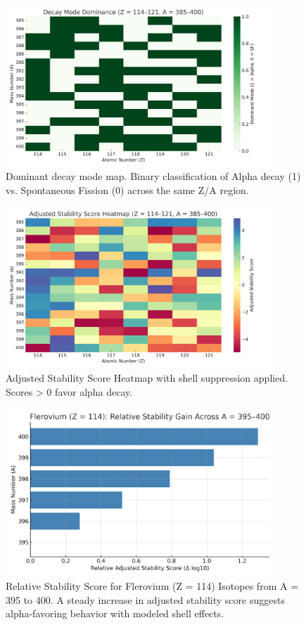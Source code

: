 \documentclass[12pt]{article}
\begin{document}
\begin{figure}[h!]
\centering
\includegraphics[width=0.9\textwidth]{decay_mode_map.png}
\caption{Dominant decay mode map. Binary classification of Alpha decay (1) vs. Spontaneous Fission (0) across the same Z/A region.}
\end{figure}

\begin{figure}[h!]
\centering
\includegraphics[width=0.9\textwidth]{stability_score_heatmap.png}
\caption{Adjusted Stability Score Heatmap with shell suppression applied. Scores > 0 favor alpha decay.}
\end{figure}

\begin{figure}[h!]
\centering
\includegraphics[width=0.9\textwidth]{relative_stability.png}
\caption{Relative Stability Score for Flerovium (Z = 114) Isotopes from A = 395 to 400. A steady increase in adjusted stability score suggests alpha-favoring behavior with modeled shell effects.}
\end{figure}
\end{document}
